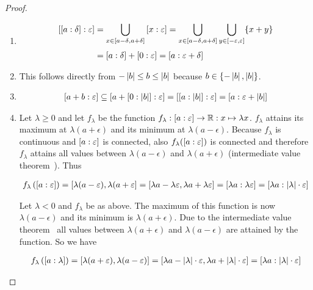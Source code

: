 \begin{proof}
\begin{enumerate}
    \item

      \begin{align}
        \an[\epsilon]{\an[\delta]{a}} & = \bigcup_{x\in \interval{a-\delta}{a+\delta}} \an[\epsilon]{x} = \bigcup_{x\in\interval{a-\delta}{a+\delta}} \bigcup_{y\in\interval{-\epsilon}{\epsilon}} \{x+y\} \nl
        &= \an[\delta]{a} + \an[\epsilon]{0} = \an[\epsilon+\delta]{a}
      \end{align}
 
    \item

      This follows directly from $-\abs{b} \le b \le \abs{b}$ because $b \in \{-\abs{b}, \abs{b}\}$.

    \item

      \begin{align}
        \an[\epsilon]{a+b} \subseteq \an[\epsilon]{a+\an[\abs{b}]{0}} = \an[\epsilon]{\an[\abs{b}]{a}} = \an[\epsilon+\abs{b}]{a}
      \end{align}

    \item
      Let $\lambda \ge 0$ and let $f_\lambda$ be the function $f_\lambda : \an[\epsilon]{a}\to\R:x\mapsto \lambda x$. $f_\lambda$ attains its maximum at $\lambda(a+\epsilon)$ and its minimum at $\lambda(a-\epsilon)$. Because $f_\lambda$ is continuous and $\an[\epsilon]{a}$ is connected, also $f_\lambda(\an[\epsilon]{a})$ is connected and therefore $f_\lambda$ attains all values between $\lambda(a-\epsilon)$ and $\lambda(a+\epsilon)$ (intermediate value theorem~\cite{wiki:intermediatevaluetheorem}). Thus

      \begin{align}
        f_\lambda\left(\an[\epsilon]{a}\right) = \interval{\lambda(a-\epsilon)}{\lambda(a+\epsilon} = \interval{\lambda a - \lambda \epsilon}{\lambda a+\lambda \epsilon} = \an[\lambda \epsilon]{\lambda a} = \an[\abs{\lambda}\cdot \epsilon]{\lambda a}
      \end{align}

      Let $\lambda < 0$ and $f_\lambda$ be as above. The maximum of this function is now $\lambda (a-\epsilon)$ and its minimum is $\lambda (a+\epsilon)$. Due to the intermediate value theorem~\cite{wiki:intermediatevaluetheorem} all values between $\lambda(a+\epsilon)$ and $\lambda(a-\epsilon)$ are attained by the function. So we have

      \begin{align}
        f_\lambda\left(\an[\lambda]{a}\right) = \interval{\lambda(a+\epsilon)}{\lambda(a-\epsilon)} = \interval{\lambda a -\abs{\lambda}\cdot \epsilon}{\lambda a + \abs{\lambda}\cdot \epsilon} = \an[\abs{\lambda}\cdot \epsilon]{\lambda a}
      \end{align}

 \end{enumerate}
\end{proof}

